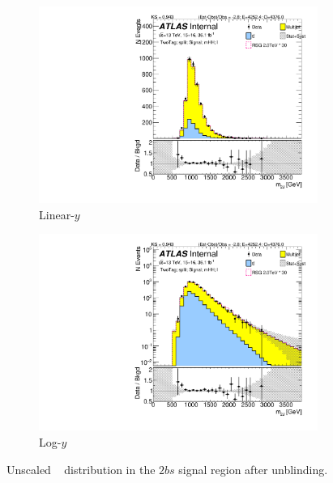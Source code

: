 \begin{figure}[htb!]
\begin{center}
    \captionsetup{justification=centering}
    \begin{subfigure}[b]{0.45\textwidth}
        \includegraphics[width=\textwidth,angle=-90]{figures/boosted/Signal_Syst/Moriond_bkg_9_TwoTag_split_Signal_mHH_l.pdf}
        \caption{Linear-$y$}
        \label{fig:boosted-2b-signal-lin}
    \end{subfigure}
    \quad
    \begin{subfigure}[b]{0.45\textwidth}
        \includegraphics[width=\textwidth,angle=-90]{figures/boosted/Signal_Syst/Moriond_bkg_9_TwoTag_split_Signal_mHH_l_1.pdf}
        \caption{Log-$y$}
        \label{fig:boosted-2b-signal-log}
    \end{subfigure}
  \caption{Unscaled \mtwoJ~ distribution in the $2bs$ signal region after unblinding.}
  \label{fig:boosted-2b-signal-l}
\end{center}
\end{figure}


